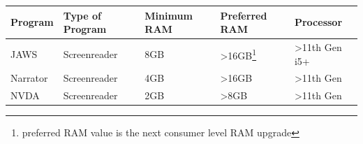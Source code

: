\documentclass[14pt, letterpaper,twoside]{extreport}
\begin{document}
\begin{longtable}[]{@{}
	>{\raggedright\arraybackslash}p{}
	>{\raggedright\arraybackslash}p{}
	>{\raggedright\arraybackslash}p{}
	>{\raggedright\arraybackslash}p{}
	>{\raggedright\arraybackslash}p{}
	}
	\toprule\noalign{}
	\textbf{Program}                                                                                                                                                                                                                                                                                                                  & \textbf{Type of Program}                   & \textbf{Minimum RAM} & \textbf{Preferred RAM}                                                                & \textbf{Processor}       \\
	\midrule\noalign{}
	\endhead
	\bottomrule\noalign{}
	\endlastfoot
	JAWS                                                                                                                                                                                                                                                                                                                              & Screenreader                               & 8GB                  & \textgreater16GB\footnote{preferred RAM value is the next consumer level RAM upgrade} & \textgreater11th Gen i5+ \\[1.0em]
	Narrator                                                                                                                                                                                                                                                                                                                          & Screenreader                               & 4GB                  & \textgreater16GB                                                                      & \textgreater11th Gen     \\[1.0em]
	NVDA                                                                                                                                                                                                                                                                                                                              & Screenreader                               & 2GB                  & \textgreater8GB                                                                       & \textgreater11th Gen     \\[1.0em]

\end{longtable}
\end{document}
